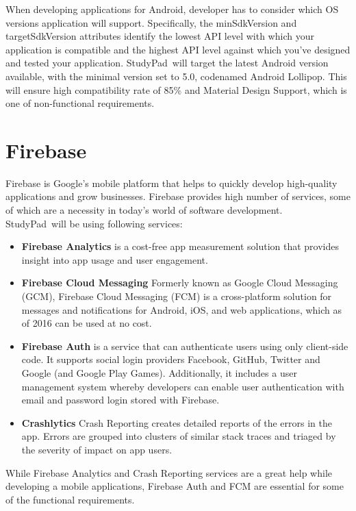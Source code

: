 \documentclass[thesis=B,english]{FITthesis}[2012/10/20]
\newcommand{\appname}{StudyPad}
\begin{document}
When developing applications for Android, developer has to consider which OS versions application will support. Specifically, the minSdkVersion and targetSdkVersion attributes  identify the lowest API level with which your application is compatible and the highest API level against which you've designed and tested your application. \appname\ will target the latest Android version available, with the minimal version set to 5.0, codenamed Android Lollipop. This will ensure high compatibility rate of 85\% and Material Design Support, which is one of non-functional requirements.

\section{Firebase}
Firebase is Google's mobile platform that helps to quickly develop high-quality applications and grow businesses. Firebase provides high number of services, some of which are a necessity in today's world of software development. \\\appname\ will be using following services:
\begin{itemize}
	\item \textbf{Firebase Analytics} is a cost-free app measurement solution that provides insight into app usage and user engagement.
	\item \textbf{Firebase Cloud Messaging} Formerly known as Google Cloud Messaging (GCM), Firebase Cloud Messaging (FCM) is a cross-platform solution for messages and notifications for Android, iOS, and web applications, which as of 2016 can be used at no cost.
	\item \textbf{Firebase Auth} is a service that can authenticate users using only client-side code. It supports social login providers Facebook, GitHub, Twitter and Google (and Google Play Games). Additionally, it includes a user management system whereby developers can enable user authentication with email and password login stored with Firebase.
	\item \textbf{Crashlytics} Crash Reporting creates detailed reports of the errors in the app. Errors are grouped into clusters of similar stack traces and triaged by the severity of impact on app users.

\end{itemize}


\noindent While Firebase Analytics and Crash Reporting services are a great help while developing a mobile applications, Firebase Auth and FCM are essential for some of the functional requirements. 
\end{document}

